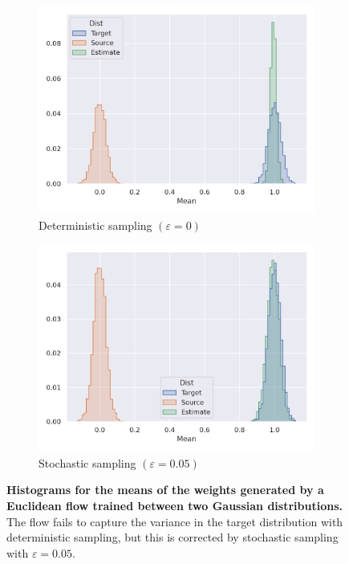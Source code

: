 \begin{figure}[t!]
    \centering
    \begin{subfigure}{0.47\linewidth}
        \centering
        \includegraphics[width=\linewidth]{figures/gaussian/0.png}
        \caption{Deterministic sampling $(\varepsilon = 0)$}
        \label{fig:gaussian_deterministic}
    \end{subfigure}
    \begin{subfigure}{0.47\linewidth}
        \centering
        \includegraphics[width=\linewidth]{figures/gaussian/0.05.png}
        \caption{Stochastic sampling $(\varepsilon = 0.05)$}
        \label{fig:gaussian_stochastic}
    \end{subfigure}
    \caption{\label{fig:gaussian-results}\textbf{Histograms for the means of the weights generated by a Euclidean flow trained between two Gaussian distributions.} The flow fails to capture the variance in the target distribution with deterministic sampling, but this is corrected by stochastic sampling with $\varepsilon = 0.05$.} 
\end{figure}

